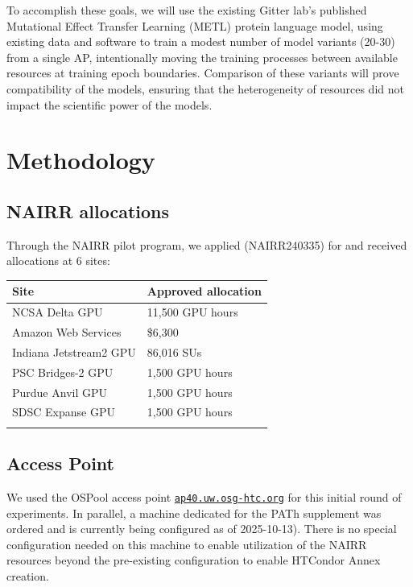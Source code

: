 \documentclass{article}
\begin{document}
To accomplish these goals, we will use the existing Gitter lab's published
Mutational Effect Transfer Learning (METL) protein language
model\cite{gelmanBiophysicsbasedProteinLanguage2025}, using existing data and
software to train a modest number of model variants (20-30) from a single AP,
intentionally moving the training processes between available resources at
training epoch boundaries. Comparison of these variants will prove compatibility
of the models, ensuring that the heterogeneity of resources did not impact the
scientific power of the models.

\section{Methodology}\label{methodology}

\subsection{NAIRR allocations}\label{nairr-allocations}

Through the NAIRR pilot program, we applied (NAIRR240335) for and
received allocations at 6 sites:

\begin{longtable}[]{@{}ll@{}}
\toprule\noalign{}
Site & Approved allocation \\
\midrule\noalign{}
\endhead
\endlastfoot
NCSA Delta GPU & 11,500 GPU hours \\
Amazon Web Services & \$6,300 \\
Indiana Jetstream2 GPU & 86,016 SUs \\
PSC Bridges-2 GPU & 1,500 GPU hours \\
Purdue Anvil GPU & 1,500 GPU hours \\
SDSC Expanse GPU & 1,500 GPU hours \\
\bottomrule\noalign{}
\end{longtable}

\subsection{Access Point}\label{access-point}

We used the OSPool access point
\href{http://ap40.uw.osg-htc.org}{\texttt{ap40.uw.osg-htc.org}} for this
initial round of experiments. In parallel, a machine dedicated for the
PATh supplement was ordered and is currently being configured as of
2025-10-13). There is no special configuration needed on this machine to
enable utilization of the NAIRR resources beyond the pre-existing
configuration to enable HTCondor Annex creation.
\end{document}
